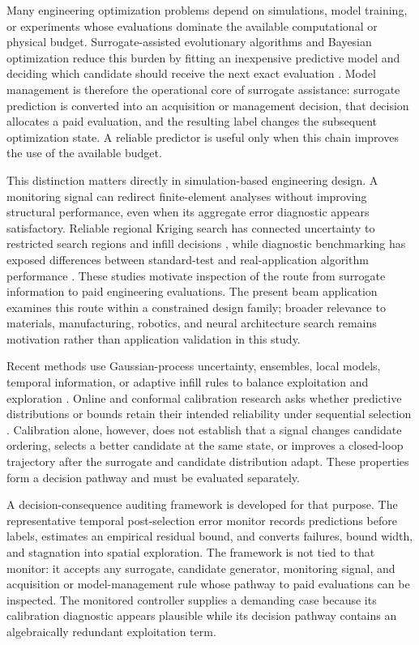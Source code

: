 \documentclass[]{interact}
\begin{document}
Many engineering optimization problems depend on simulations, model training, or experiments whose evaluations dominate the available computational or physical budget. Surrogate-assisted evolutionary algorithms and Bayesian optimization reduce this burden by fitting an inexpensive predictive model and deciding which candidate should receive the next exact evaluation \citep{ref01,ref02,ref03,ref04,ref05}. Model management is therefore the operational core of surrogate assistance: surrogate prediction is converted into an acquisition or management decision, that decision allocates a paid evaluation, and the resulting label changes the subsequent optimization state. A reliable predictor is useful only when this chain improves the use of the available budget.

This distinction matters directly in simulation-based engineering design. A monitoring signal can redirect finite-element analyses without improving structural performance, even when its aggregate error diagnostic appears satisfactory. Reliable regional Kriging search has connected uncertainty to restricted search regions and infill decisions \citep{ref35}, while diagnostic benchmarking has exposed differences between standard-test and real-application algorithm performance \citep{ref34}. These studies motivate inspection of the route from surrogate information to paid engineering evaluations. The present beam application examines this route within a constrained design family; broader relevance to materials, manufacturing, robotics, and neural architecture search remains motivation rather than application validation in this study.

Recent methods use Gaussian-process uncertainty, ensembles, local models, temporal information, or adaptive infill rules to balance exploitation and exploration \citep{ref06,ref07,ref08,ref09,ref10,ref11}. Online and conformal calibration research asks whether predictive distributions or bounds retain their intended reliability under sequential selection \citep{ref12,ref13,ref14,ref15}. Calibration alone, however, does not establish that a signal changes candidate ordering, selects a better candidate at the same state, or improves a closed-loop trajectory after the surrogate and candidate distribution adapt. These properties form a decision pathway and must be evaluated separately.

A decision-consequence auditing framework is developed for that purpose. The representative temporal post-selection error monitor records predictions before labels, estimates an empirical residual bound, and converts failures, bound width, and stagnation into spatial exploration. The framework is not tied to that monitor: it accepts any surrogate, candidate generator, monitoring signal, and acquisition or model-management rule whose pathway to paid evaluations can be inspected. The monitored controller supplies a demanding case because its calibration diagnostic appears plausible while its decision pathway contains an algebraically redundant exploitation term.
\end{document}
